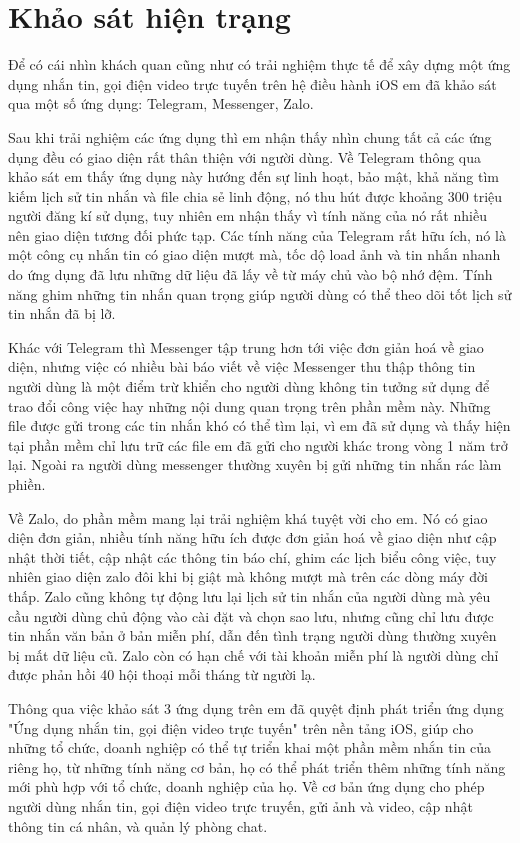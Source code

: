\documentclass[../DoAn.tex]{subfiles}
\begin{document}
\section{Khảo sát hiện trạng}
\label{section:2.1}
Để có cái nhìn khách quan cũng như có trải nghiệm thực tế để xây dựng một ứng dụng nhắn tin, gọi điện video trực tuyến trên hệ điều hành iOS em đã khảo sát qua một số ứng dụng: Telegram, Messenger, Zalo.

Sau khi trải nghiệm các ứng dụng thì em nhận thấy nhìn chung tất cả các ứng dụng đều có giao diện rất thân thiện với người dùng. Về Telegram thông qua khảo sát em thấy ứng dụng này hướng đến sự linh hoạt, bảo mật, khả năng tìm kiếm lịch sử tin nhắn và file chia sẻ linh động, nó thu hút được khoảng 300 triệu người đăng kí sử dụng, tuy nhiên em nhận thấy vì tính năng của nó rất nhiều nên giao diện tương đối phức tạp. Các tính năng của Telegram rất hữu ích, nó là một công cụ nhắn tin có giao diện mượt mà, tốc dộ load ảnh và tin nhắn nhanh do ứng dụng đã lưu những dữ liệu đã lấy về từ máy chủ vào bộ nhớ đệm. Tính năng ghim những tin nhắn quan trọng giúp người dùng có thể theo dõi tốt lịch sử tin nhắn đã bị lỡ.

Khác với Telegram thì Messenger tập trung hơn tới việc đơn giản hoá về giao diện, nhưng việc có nhiều bài báo viết về việc Messenger thu thập thông tin người dùng là một điểm trừ khiển cho người dùng không tin tưởng sử dụng để trao đổi công việc hay những nội dung quan trọng trên phần mềm này. Những file được gửi trong các tin nhắn khó có thể tìm lại, vì em đã sử dụng và thấy hiện tại phần mềm chỉ lưu trữ các file em đã gửi cho người khác trong vòng 1 năm trở lại. Ngoài ra người dùng messenger thường xuyên bị gửi những tin nhắn rác làm phiền.

Về Zalo, do phần mềm mang lại trải nghiệm khá tuyệt vời cho em. Nó có giao diện đơn giản, nhiều tính năng hữu ích được đơn giản hoá về giao diện như cập nhật thời tiết, cập nhật các thông tin báo chí, ghim các lịch biểu công việc, tuy nhiên giao diện zalo đôi khi bị giật mà không mượt mà trên các dòng máy đời thấp. Zalo cũng không tự động lưu lại lịch sử tin nhắn của người dùng mà yêu cầu người dùng chủ động vào cài đặt và chọn sao lưu, nhưng cũng chỉ lưu được tin nhắn văn bản ở bản miễn phí, dẫn đến tình trạng người dùng thường xuyên bị mất dữ liệu cũ. Zalo còn có hạn chế với tài khoản miễn phí là người dùng chỉ được phản hồi 40 hội thoại mỗi tháng từ người lạ.

Thông qua việc khảo sát 3 ứng dụng trên em đã quyệt định phát triển ứng dụng "Ứng dụng nhắn tin, gọi điện video trực tuyến" trên nền tảng iOS, giúp cho những tổ chức, doanh nghiệp có thể tự triển khai một phần mềm nhắn tin của riêng họ, từ những tính năng cơ bản, họ có thể phát triển thêm những tính năng mới phù hợp với tổ chức, doanh nghiệp của họ. Về cơ bản ứng dụng cho phép người dùng nhắn tin, gọi điện video trực truyến, gửi ảnh và video, cập nhật thông tin cá nhân, và quản lý phòng chat.
\end{document}
